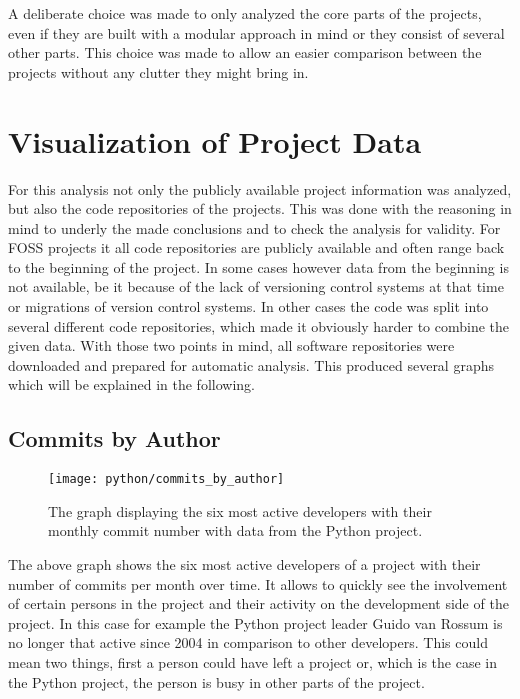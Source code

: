 A deliberate choice was made to only analyzed the core parts of the projects,
even if they are built with a modular approach in mind or they consist of
several other parts. This choice was made to allow an easier comparison between
the projects without any clutter they might bring in.


\section{Visualization of Project Data} %

For this analysis not only the publicly available project information was
analyzed, but also the code repositories of the projects. This was done with
the reasoning in mind to underly the made conclusions and to check the analysis
for validity. For \ac{FOSS} projects it all code repositories are publicly
available and often range back to the beginning of the project. In some cases
however data from the beginning is not available, be it because of the lack of
versioning control systems at that time or migrations of version control
systems. In other cases the code was split into several different code
repositories, which made it obviously harder to combine the given data. With
those two points in mind, all software repositories were downloaded and
prepared for automatic analysis. This produced several graphs which will be
explained in the following.

\subsection{Commits by Author} %

\begin{figure}[h!t]
  \centering
  \texttt{[image: python/commits\_by\_author]}
  \caption{The graph displaying the six most active developers with their
  monthly commit number with data from the Python project.}
\end{figure}

The above graph shows the six most active developers of a project with their
number of commits per month over time. It allows to quickly see the involvement
of certain persons in the project and their activity on the development side of
the project. In this case for example the Python project leader Guido van
Rossum is no longer that active since 2004 in comparison to other developers.
This could mean two things, first a person could have left a project or, which
is the case in the Python project, the person is busy in other parts of the
project.

